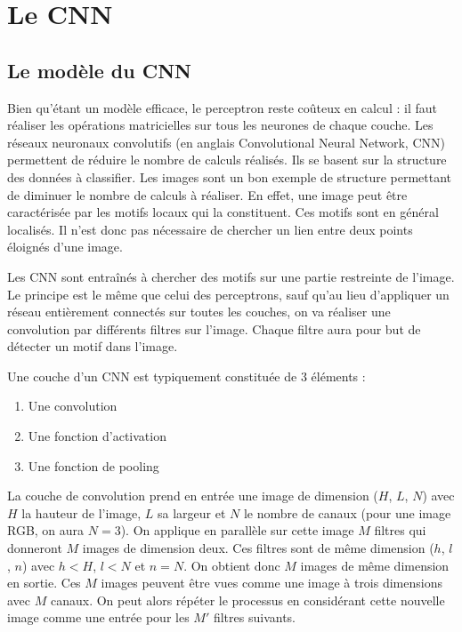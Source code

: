 \section{Le CNN}

\subsection{Le modèle du CNN}

Bien qu'étant un modèle efficace, le perceptron reste coûteux en calcul : il faut réaliser les opérations matricielles sur tous les neurones de chaque couche.
Les réseaux neuronaux convolutifs (en anglais Convolutional Neural Network, CNN) permettent de réduire le nombre de calculs réalisés. Ils se basent sur la structure des données à classifier.
Les images sont un bon exemple de structure permettant de diminuer le nombre de calculs à réaliser. En effet, une image peut être caractérisée par les motifs locaux qui la constituent. Ces motifs sont en général localisés. Il n'est donc pas nécessaire de chercher un lien entre deux points éloignés d'une image.

Les CNN sont entraînés à chercher des motifs sur une partie restreinte de l'image.
Le principe est le même que celui des perceptrons, sauf qu'au lieu d'appliquer un réseau entièrement connectés sur toutes les couches, on va réaliser une convolution par différents filtres sur l'image. Chaque filtre aura pour but de détecter un motif dans l'image.

Une couche d'un CNN est typiquement constituée de 3 éléments : 
\begin{enumerate}
 \item Une convolution
 \item Une fonction d'activation
 \item Une fonction de pooling
\end{enumerate}

La couche de convolution prend en entrée une image de dimension ($H$, $L$, $N$) avec $H$ la hauteur de l'image, $L$ sa largeur et $N$ le nombre de canaux (pour une image RGB, on aura $N = 3$). 
On applique en parallèle sur cette image $M$ filtres qui donneront $M$ images de dimension deux. Ces filtres sont de même dimension ($h$, $l$, $n$) avec $h<H$, $l<N$ et $n=N$. On obtient donc $M$ images de même dimension en sortie. Ces $M$ images peuvent être vues comme une image à trois dimensions avec $M$ canaux. On peut alors répéter le processus en considérant cette nouvelle image comme une entrée pour les $M'$ filtres suivants.

